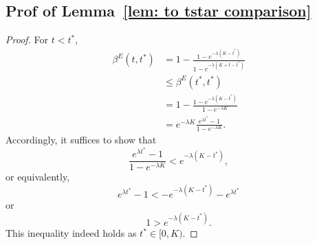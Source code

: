 \documentclass[12pt, letterpaper]{article}
\begin{document}
\subsection{Prof of Lemma~\ref{lem: to tstar comparison}}
\begin{proof} %
For $t < t^*$,
\begin{align}
    \beta^E(t, t^*) &= 1 - \frac{1 - e^{-\lambda (K - t^*)}}{1 - e^{- \lambda(K + t - t^*)}} \\
    &\le \beta^E(t^*, t^*) \\
    & = 1 - \frac{1 - e^{-\lambda (K - t^*)}}{1 - e^{- \lambda K}}\\
    & = e^{-\lambda K} \frac{e^{\lambda t^*} - 1}{1 - e^{-\lambda K}}.
\end{align}
Accordingly, it suffices to show that
\begin{equation}
    \frac{e^{\lambda t^*} - 1}{1 - e^{-\lambda K}} < e^{-\lambda (K - t^*)},
\end{equation}
or equivalently,
\begin{equation}
    e^{\lambda t^*} - 1 < - e^{-\lambda (K - t^*)} - e^{\lambda t^*}
\end{equation}
or
\begin{equation}
    1 > e^{-\lambda (K - t^*)}.
\end{equation}
This inequality indeed holds as $t^* \in [0, K)$.
\end{proof} %
\end{document}
